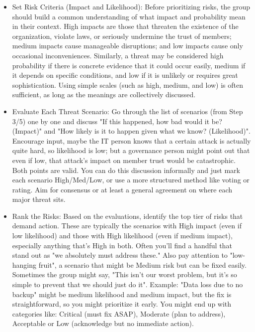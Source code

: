 \begin{itemize}   
    \item Set Risk Criteria (Impact and Likelihood): Before prioritizing risks,
    the group should build a common understanding of what impact
    and probability mean in their context. High impacts are those that
    threaten the existence of the organization, violate laws, or seriously undermine
    the trust of members; medium impacts cause manageable disruptions; and low
    impacts cause only occasional inconveniences. Similarly, a threat may be
    considered high probability if there is concrete evidence that it could occur
    easily, medium if it depends on specific conditions, and low if it is unlikely
    or requires great sophistication. Using simple scales (such as high, medium, and
    low) is often sufficient, as long as the meanings are collectively discussed.

    \item Evaluate Each Threat Scenario: Go through the list of scenarios (from Step 3/5) one by one and discuss
    "If this happened, how bad would it be? (Impact)" and "How likely is it to happen given what
    we know? (Likelihood)". Encourage input, maybe the IT person knows that a certain attack is actually quite hard, so
    likelihood is low; but a governance person might point out that even if low, that attack's impact on member
    trust would be catastrophic. Both points are valid. You can do this discussion informally and just
    mark each scenario High/Med/Low, or use a more structured method like voting or rating.
    Aim for consensus or at least a general agreement on where each major threat sits.
    
    \item Rank the Risks: Based on the evaluations, identify the top tier of risks that demand action. These
    are typically the scenarios with High impact (even if low likelihood) and those with High likelihood (even if
    medium impact), especially anything that's High in both. Often you'll find a handful that stand out as "we
    absolutely must address these."
    Also pay attention to "low-hanging fruit", a scenario that might be Medium risk but can be
    fixed easily. Sometimes the group might say, "This isn't our worst problem, but it's so simple to prevent that
    we should just do it". Example: "Data loss due to no backup" might be medium likelihood and medium impact,
    but the fix is straightforward, so you might prioritize it early.
    You might end up with categories like: Critical (must fix ASAP), Moderate (plan to address),
    Acceptable or Low (acknowledge but no immediate action).


\end{itemize}
